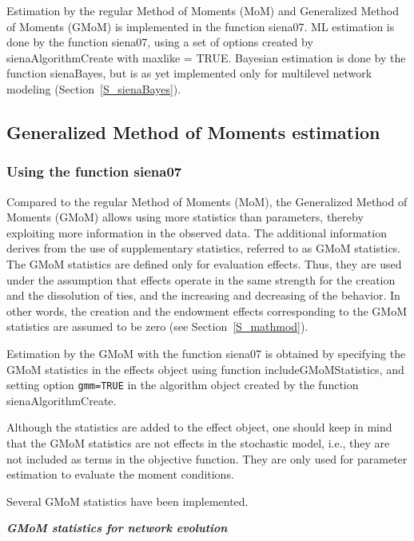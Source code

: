 \documentclass[a4paper,fleqn,11pt]{article}
\newcommand{\+}{\, + \,}
\newcommand{\sfn}[1]{\textsf{#1}}
\begin{document}
Estimation by the regular Method of Moments (MoM)
and Generalized Method of Moments (GMoM)
is implemented in the function \sfn{siena07}.%
ML estimation is done by the function \sfn{siena07}, using a set of options
created by \sfn{sienaAlgorithmCreate} with \sfn{maxlike = TRUE}.
Bayesian estimation is done by the function \sfn{sienaBayes},
but is as yet implemented only for multilevel network modeling
(Section~\ref{S_sienaBayes}).


\subsection{Generalized Method of Moments estimation}
\label{S_GMoM}

\subsubsection{Using the function \sfn{siena07}}
\label{S_GMoM_siena07}


Compared to the regular Method of Moments (MoM), the Generalized Method of
Moments (GMoM) allows using more statistics than parameters,
thereby exploiting more information in the observed data.
The additional information derives from the use of supplementary statistics,
referred to as GMoM statistics. The GMoM statistics are defined only for
evaluation effects. Thus, they are used under the assumption that
effects operate in the same strength for the creation and the dissolution of ties,
and the increasing and decreasing of the behavior. In other words,
the creation and the endowment effects
corresponding to the GMoM statistics are assumed to be zero
(see Section~\ref{S_mathmod}).
\medskip

Estimation by the GMoM with the function \sfn{siena07} is obtained
by specifying the GMoM statistics in the effects object using
function \sfn{includeGMoMStatistics},
and setting option \texttt{gmm=TRUE}
in the algorithm object created by the function \sfn{sienaAlgorithmCreate}.

Although the statistics are added to the effect object,
one should keep in mind that the GMoM statistics are not effects
in the stochastic model, i.e., they are not
included as terms in the objective function.
They are only used for parameter estimation to evaluate the moment conditions.

Several GMoM statistics have been implemented.
\bigskip

\noindent
\textbf{\emph{GMoM statistics for network evolution }}
\medskip
\end{document}
